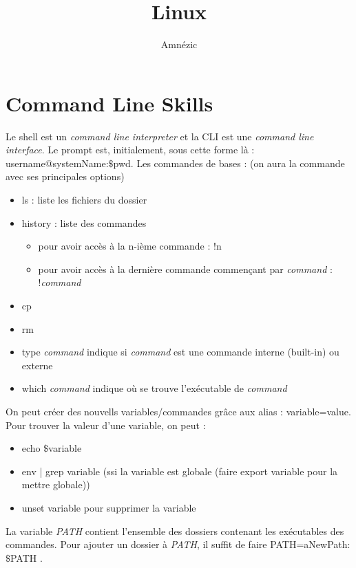 \documentclass{article}
\author{Amnézic}
\date{}
\title{Linux}
\begin{document}
\maketitle
\newpage
\tableofcontents
\newpage

\section{Command Line Skills}
Le shell est un \textit{command line interpreter} et la CLI est une \textit{command line interface}.\newline
Le prompt est, initialement, sous cette forme là : username@systemName:$\$$pwd.\newline
Les commandes de bases : (on aura la commande avec ses principales options)
\begin{itemize}
    \item ls : liste les fichiers du dossier
    \item history : liste des commandes
        \begin{itemize}
            \item pour avoir accès à la n-ième commande : !n
            \item pour avoir accès à la dernière commande commençant par \textit{command} : !\textit{command}
        \end{itemize}
    \item cp
    \item rm
    \item type \textit{command} indique si \textit{command} est une commande interne (built-in) ou externe
    \item which \textit{command} indique où se trouve l'exécutable de \textit{command}
\end{itemize}

\noindent On peut créer des nouvells variables/commandes grâce aux alias : variable=value. Pour trouver la valeur d'une variable, on peut :
\begin{itemize}
    \item echo $\$$variable
    \item env | grep variable (ssi la variable est globale (faire export variable pour la mettre globale))
    \item unset variable pour supprimer la variable
\end{itemize}

La variable \textit{PATH} contient l'ensemble des dossiers contenant les exécutables des commandes. Pour ajouter un dossier à \textit{PATH}, il suffit de faire PATH=aNewPath:$\$$PATH .\newline
\end{document}
